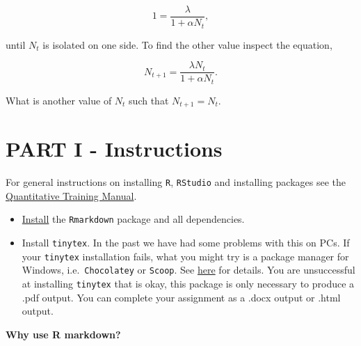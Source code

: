 \documentclass[
]{book}
\providecommand{\tightlist}{%
  \setlength{\itemsep}{0pt}\setlength{\parskip}{0pt}}
\begin{document}
\[
1 = \frac{\lambda}{1+\alpha N_t},
\]

until \(N_t\) is isolated on one side. To find the other value inspect the equation,

\[
N_{t+1} = \frac{\lambda N_t}{1+\alpha N_t}.
\]

What is another value of \(N_t\) such that \(N_{t+1}=N_t\).

\hypertarget{partI}{%
\chapter*{PART I - Instructions}\label{partI}}

For general instructions on installing \texttt{R}, \texttt{RStudio} and installing packages see the \href{https://ahurford.github.io/quant-guide-all-courses/}{Quantitative Training Manual}.

\begin{itemize}
\tightlist
\item
  \href{https://ahurford.github.io/quant-guide-all-courses/install.html}{Install} the \texttt{Rmarkdown} package and all dependencies.
\item
  Install \texttt{tinytex}. In the past we have had some problems with this on PCs. If your \texttt{tinytex} installation fails, what you might try is a package manager for Windows, i.e.~\texttt{Chocolatey} or \texttt{Scoop}. See \href{https://github.com/rstudio/tinytex-releases}{here} for details. You are unsuccessful at installing \texttt{tinytex} that is okay, this package is only necessary to produce a .pdf output. You can complete your assignment as a .docx output or .html output.
\end{itemize}

\textbf{Why use R markdown?}
\end{document}

